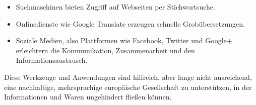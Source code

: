\documentclass[]{../../metanetpaper}
\begin{document}
\begin{Parallel}[c]{80mm}{80mm}
{\begin{itemize}
      \item Suchmaschinen bieten Zugriff auf Webseiten per Stichwortsuche.
      \item Onlinedienste wie Google Translate erzeugen schnelle Grobübersetzungen.
      \item Soziale Medien, also Plattformen wie Facebook, Twitter und Google+ erleichtern die Kommunikation, Zusammenarbeit und den Informationsaustausch.
    \end{itemize}
Diese Werkzeuge und Anwendungen sind hilfreich, aber lange nicht ausreichend, eine nachhaltige, mehrsprachige europäische Gesellschaft zu unterstützen, in der Informationen und Waren ungehindert fließen können.
  }

\end{Parallel}
\end{document}
